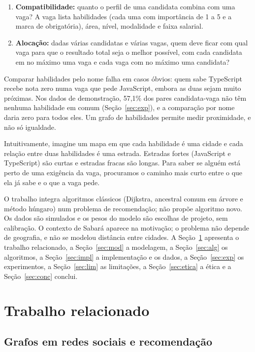 \documentclass[12pt]{article}
\begin{document}
\begin{enumerate}
\item \textbf{Compatibilidade:} quanto o perfil de uma candidata combina com uma vaga? A vaga lista habilidades (cada uma com importância de 1 a 5 e a marca de obrigatória), área, nível, modalidade e faixa salarial.
\item \textbf{Alocação:} dadas várias candidatas e várias vagas, quem deve ficar com qual vaga para que o resultado total seja o melhor possível, com cada candidata em no máximo uma vaga e cada vaga com no máximo uma candidata?
\end{enumerate}

Comparar habilidades pelo nome falha em casos óbvios: quem sabe TypeScript recebe nota zero numa vaga que pede JavaScript, embora as duas sejam muito próximas. Nos dados de demonstração, 57,1\% dos pares candidata-vaga não têm nenhuma habilidade em comum (Seção~\ref{sec:exp}), e a comparação por nome daria zero para todos eles. Um grafo de habilidades permite medir proximidade, e não só igualdade.

Intuitivamente, imagine um mapa em que cada habilidade é uma cidade e cada relação entre duas habilidades é uma estrada. Estradas fortes (JavaScript e TypeScript) são curtas e estradas fracas são longas. Para saber se alguém está perto de uma exigência da vaga, procuramos o caminho mais curto entre o que ela já sabe e o que a vaga pede.

O trabalho integra algoritmos clássicos (Dijkstra, ancestral comum em árvore e método húngaro) num problema de recomendação; não propõe algoritmo novo. Os dados são simulados e os pesos do modelo são escolhas de projeto, sem calibração. O contexto de Sabará aparece na motivação; o problema não depende de geografia, e não se modelou distância entre cidades. A Seção~\ref{sec:rel} apresenta o trabalho relacionado, a Seção~\ref{sec:mod} a modelagem, a Seção~\ref{sec:alg} os algoritmos, a Seção~\ref{sec:impl} a implementação e os dados, a Seção~\ref{sec:exp} os experimentos, a Seção~\ref{sec:lim} as limitações, a Seção~\ref{sec:etica} a ética e a Seção~\ref{sec:conc} conclui.

\section{Trabalho relacionado}
\label{sec:rel}

\subsection{Grafos em redes sociais e recomendação}
\end{document}
